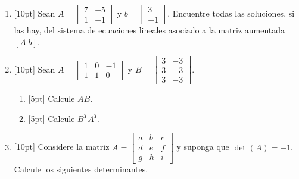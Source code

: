 \documentclass[11pt]{article}
\begin{document}
\begin{enumerate}
\item{}[10pt] Sean $A = \begin{bmatrix}7 & -5\\ 1 & -1\end{bmatrix}$ y $b = \begin{bmatrix}3\\-1\end{bmatrix}$. Encuentre todas las soluciones, si las hay, del sistema de ecuaciones lineales asociado a la matriz aumentada $[A|b]$.

\vspace{4pt}

\item{}[10pt] Sean $A = \begin{bmatrix}1 & 0 & -1\\ 1 & 1 & 0\end{bmatrix}$ y $B = \begin{bmatrix}3 & -3\\ 3 & -3\\ 3 & -3\end{bmatrix}$.
\begin{enumerate}
\item{}[5pt] Calcule $AB$.

\vspace{4pt}

\item{}[5pt] Calcule $B^TA^T$.

\vspace{4pt}
\end{enumerate}

\item{}[10pt] Considere la matriz $A = \begin{bmatrix}a & b & c\\ d & e & f\\ g & h & i\end{bmatrix}$ y suponga que $\det(A) = -1$. Calcule los siguientes determinantes.


\end{enumerate}
\end{document}
